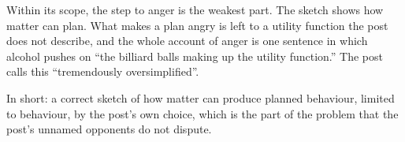 \begin{afterword}
Within its scope, the step to anger is the weakest part. The sketch shows how matter can plan. What makes a plan angry is left to a utility function the post does not describe, and the whole account of anger is one sentence in which alcohol pushes on ``the billiard balls making up the utility function.'' The post calls this ``tremendously oversimplified''.

In short: a correct sketch of how matter can produce planned behaviour, limited to behaviour, by the post's own choice, which is the part of the problem that the post's unnamed opponents do not dispute.
\end{afterword}
